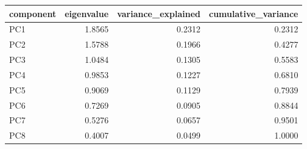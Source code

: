 \begin{tabular}{lrrr}
\toprule
component & eigenvalue & variance\_explained & cumulative\_variance \\
\midrule
PC1 & 1.8565 & 0.2312 & 0.2312 \\
PC2 & 1.5788 & 0.1966 & 0.4277 \\
PC3 & 1.0484 & 0.1305 & 0.5583 \\
PC4 & 0.9853 & 0.1227 & 0.6810 \\
PC5 & 0.9069 & 0.1129 & 0.7939 \\
PC6 & 0.7269 & 0.0905 & 0.8844 \\
PC7 & 0.5276 & 0.0657 & 0.9501 \\
PC8 & 0.4007 & 0.0499 & 1.0000 \\
\bottomrule
\end{tabular}
